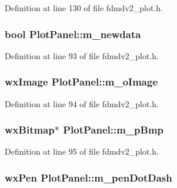 Definition at line 130 of file fdmdv2\-\_\-plot.\-h.

\hypertarget{class_plot_panel_a803a71153ab9758b6134fc51855a71b3}{
\subsubsection[{m\-\_\-newdata}]{\setlength{\rightskip}{0pt plus 5cm}bool Plot\-Panel\-::m\-\_\-newdata}}\label{class_plot_panel_a803a71153ab9758b6134fc51855a71b3}


Definition at line 93 of file fdmdv2\-\_\-plot.\-h.

\hypertarget{class_plot_panel_a455990d37fec44ad2eeb97b6be7016fe}{
\subsubsection[{m\-\_\-o\-Image}]{\setlength{\rightskip}{0pt plus 5cm}wx\-Image Plot\-Panel\-::m\-\_\-o\-Image}}\label{class_plot_panel_a455990d37fec44ad2eeb97b6be7016fe}


Definition at line 94 of file fdmdv2\-\_\-plot.\-h.

\hypertarget{class_plot_panel_a931b1810b974771f4f79ebc9b2690833}{
\subsubsection[{m\-\_\-p\-Bmp}]{\setlength{\rightskip}{0pt plus 5cm}wx\-Bitmap$\ast$ Plot\-Panel\-::m\-\_\-p\-Bmp}}\label{class_plot_panel_a931b1810b974771f4f79ebc9b2690833}


Definition at line 95 of file fdmdv2\-\_\-plot.\-h.

\hypertarget{class_plot_panel_a227751dba1777b261ffdc27b53fb087d}{
\subsubsection[{m\-\_\-pen\-Dot\-Dash}]{\setlength{\rightskip}{0pt plus 5cm}wx\-Pen Plot\-Panel\-::m\-\_\-pen\-Dot\-Dash}}\label{class_plot_panel_a227751dba1777b261ffdc27b53fb087d}


